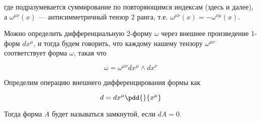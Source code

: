 \documentclass[12pt]{kiarticle}
\begin{document}
где подразумевается суммирование по повторяющимся индексам (здесь и далее), а $ \omega^{\mu\nu} (x)$ --- антисимметричный тензор 2 ранга, т.е. $ \omega^{\mu\nu} (x) = -  \omega^{\nu\mu} (x)$.

Можно определить дифференциальную 2-форму $ \omega $ через внешнее произведение 1-форм $ dx^\mu $, и тогда будем говорить, что каждому нашему тензору $ \omega^{\mu\nu} $ соответствует форма $ \omega $, такая что

\begin{equation}\label{}
\omega = \omega^{\mu\nu} dx^\mu \wedge dx^\nu
\end{equation} 

Определим операцию внешнего дифференцирования формы как

 \begin{equation}\label{}
d = dx^\mu \pdd{}{x^\mu}
\end{equation}

Тогда форма $ A $ будет называться замкнутой, если $ dA = 0 $.
\end{document}
